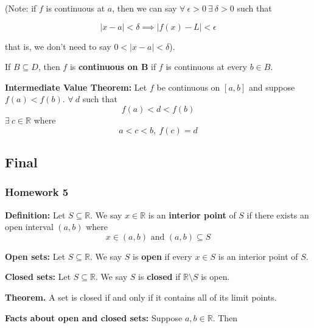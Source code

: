\documentclass{article}
\begin{document}
(Note: if \(f\) is continuous at \(a\), then we can say \(\forall \ \epsilon > 0 \ \exists \ \delta > 0 \) such that

\[
|x - a| < \delta \implies |f(x) - L| < \epsilon
\]

that is, we don't need to say \(0 < |x - a| < \delta\)).

If \(B \subseteq D\), then \(f\) is \textbf{continuous on B} if \(f\) is continuous at every \(b \in B\).

\textbf{Intermediate Value Theorem:} Let \(f\) be continuous on \([a, b]\) and suppose \(f(a) < f(b)\). \(\forall \ d\) such that \[f(a) < d < f(b)\]  \(\exists \ c \in \mathbb{R}\) where \[a < c < b, \ f(c) = d\]

\pagebreak

\subsection{Final}

\subsubsection{Homework 5}

\textbf{Definition:} Let \(S \subseteq \mathbb{R}\). We say \(x \in \mathbb{R}\) is an \textbf{interior point} of \(S\) if there exists an open interval \((a, b)\) where \[x \in (a, b) \text{ and } (a, b) \subseteq S\]

\textbf{Open sets:} Let \(S \subseteq \mathbb{R}\). We say \(S\) is \textbf{open} if every \(x \in S\) is an interior point of \(S\).

\textbf{Closed sets:} Let \(S \subseteq \mathbb{R}\). We say \(S\) is \textbf{closed} if \(\mathbb{R} \setminus S\) is open.

\textbf{Theorem.} A set is closed if and only if it contains all of its limit points.

\textbf{Facts about open and closed sets:} Suppose \(a, b \in \mathbb{R}\). Then
\end{document}
